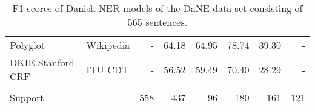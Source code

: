 \documentclass[main.tex]{subfiles}
\begin{document}
\begin{table}
\begin{center}
\begin{tabular}{l l r r r r r r}
                        Polyglot & Wikipedia & - & 64.18 & 64.95 & 78.74 & 39.30 & - \\                             
                        DKIE Stanford CRF & ITU CDT & - & 56.52 & 59.49 & 70.40 & 28.29 & - \\                      
                         &  &  &  &  &  &  &  \\          
                        Support &  & 558 & 437 & 96 & 180 & 161 & 121 \\                                            
                \end{tabular}                             
        \end{center}                                      
        \caption{F1\pro-scores of Danish NER models of the DaNE data-set consisting of 565 sentences.}              
        \label{tab:DaNE}                                  
\end{table}                                               
\end{document}
